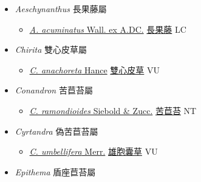 
  \begin{itemize}
 \item[] \textit{Aeschynanthus} 長果藤屬
                    
  \begin{itemize}
        \item[] \href{http://www.theplantlist.org/tpl1.1/search?q=Aeschynanthus+acuminatus}{\textit{A. acuminatus} Wall. ex A.DC.}   \href{\detokenize{http://taibnet.sinica.edu.tw/chi/taibnet_species_list.php?T2=長果藤&T2_new_value=true&fr=y}}{長果藤} LC
  \end{itemize}
 \item[] \textit{Chirita} 雙心皮草屬
                    
  \begin{itemize}
        \item[] \href{http://www.theplantlist.org/tpl1.1/search?q=Chirita+anachoreta}{\textit{C. anachoreta} Hance}   \href{\detokenize{http://taibnet.sinica.edu.tw/chi/taibnet_species_list.php?T2=雙心皮草&T2_new_value=true&fr=y}}{雙心皮草} VU
  \end{itemize}
 \item[] \textit{Conandron} 苦苣苔屬
                    
  \begin{itemize}
        \item[] \href{http://www.theplantlist.org/tpl1.1/search?q=Conandron+ramondioides}{\textit{C. ramondioides} Siebold \& Zucc.}   \href{\detokenize{http://taibnet.sinica.edu.tw/chi/taibnet_species_list.php?T2=苦苣苔&T2_new_value=true&fr=y}}{苦苣苔} NT
  \end{itemize}
 \item[] \textit{Cyrtandra} 偽苦苣苔屬
                    
  \begin{itemize}
        \item[] \href{http://www.theplantlist.org/tpl1.1/search?q=Cyrtandra+umbellifera}{\textit{C. umbellifera} Merr.}   \href{\detokenize{http://taibnet.sinica.edu.tw/chi/taibnet_species_list.php?T2=雄胞囊草&T2_new_value=true&fr=y}}{雄胞囊草} VU
  \end{itemize}
 \item[] \textit{Epithema} 盾座苣苔屬
                    

\end{itemize}
